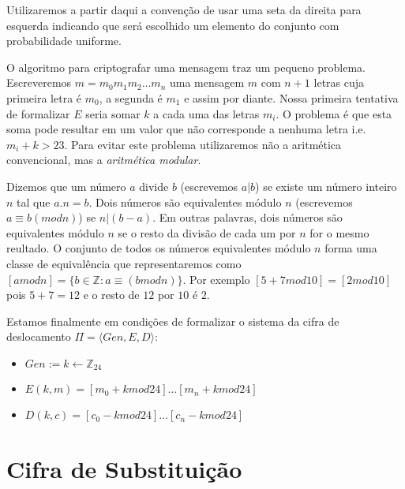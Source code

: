 Utilizaremos a partir daqui a convenção de usar uma seta da direita para esquerda indicando que será escolhido um elemento do conjunto com probabilidade uniforme.

O algoritmo para criptografar uma mensagem traz um pequeno problema.
Escreveremos $m = m_0 m_1 m_2 \dots m_n$ uma mensagem $m$ com $n + 1$ letras cuja primeira letra é $m_0$, a segunda é $m_1$ e assim por diante.
Nossa primeira tentativa de formalizar $E$ seria somar $k$ a cada uma das letras $m_i$.
O problema é que esta soma pode resultar em um valor que não corresponde a nenhuma letra i.e. $m_i + k > 23$.
Para evitar este problema utilizaremos não a aritmética convencional, mas a {\em aritmética modular}.

Dizemos que um número $a$ divide $b$ (escrevemos $a|b$) se existe um número inteiro $n$ tal que $a.n = b$.
Dois números são equivalentes módulo $n$ (escrevemos $a \equiv b (mod n)$) se $n|(b-a)$.
Em outras palavras, dois números são equivalentes módulo $n$ se o resto da divisão de cada um por $n$ for o mesmo reultado.
O conjunto de todos os números equivalentes módulo $n$ forma uma classe de equivalência que representaremos como $[a mod n] = \{b \in \mathbb{Z} : a \equiv (b mod n)\}$.
Por exemplo $[5 + 7 mod 10] = [2 mod 10]$ pois $5 + 7 = 12$ e o resto de $12$ por $10$ é $2$.

Estamos finalmente em condições de formalizar o sistema da cifra de deslocamento $\Pi = \langle Gen, E, D\rangle$:
\begin{itemize}
\item $Gen := k \leftarrow \mathbb{Z}_{24}$
\item $E(k, m) = [m_0 + k mod 24] \dots [m_n + k mod 24]$
\item $D(k, c) = [c_0 - k mod 24] \dots [c_n - k mod 24]$ 
\end{itemize}


\section{Cifra de Substituição}
\label{sec:cifra-monoalfabetica}




